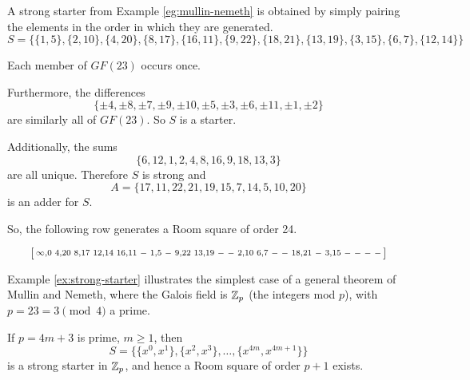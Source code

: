 \begin{example}[label=ex:strong-starter]
A strong starter from Example \ref{eg:mullin-nemeth} is obtained by simply pairing the elements in the order in which they are generated.
\begin{equation}
S = \{\{1, 5\}, \{2, 10\}, \{4, 20\}, \{8, 17\}, \{16, 11\}, \{9, 22\}, \{18, 21\}, \{13, 19\}, \{3, 15\}, \{6, 7\}, \{12, 14\}\}
\end{equation}

Each member of $GF(23)$ occurs once.

Furthermore, the differences
\begin{equation}
  \{\pm 4, \pm 8, \pm 7, \pm 9, \pm 10, \pm 5, \pm 3, \pm 6, \pm 11, \pm 1, \pm 2\}
\end{equation}
are similarly all of $GF(23)$.
So $S$ is a starter.

Additionally, the sums
\begin{equation}
  \{6, 12, 1, 2, 4, 8, 16, 9, 18, 13, 3\}
\end{equation}
are all unique.
Therefore $S$ is strong and
\begin{equation}
  A = \{17, 11, 22, 21, 19, 15, 7, 14, 5, 10, 20\}
\end{equation}
is an adder for $S$.

So, the following row generates a Room square of order 24.

\begin{equation*}
  \begin{bsmallmatrix}
    \infty, 0 & 4,20 & 8,17 & 12,14 & 16,11 & - & 1,5 & - & 9,22 & 13,19 & - & - & 2,10 & 6,7 & - & - & 18,21 & - & 3,15 & - & - & - & - \\
  \end{bsmallmatrix}
\end{equation*}

\end{example}

Example \ref{ex:strong-starter} illustrates the simplest case of a general theorem of Mullin and Nemeth, where the Galois field is $\mathbb{Z}_{p}$ (the integers mod $p$), with $p = 23 = 3\pmod 4$ a prime.

\begin{theorem}
\label{thm:strong-starter}
If $p = 4m + 3$ is prime, $m \geq 1$, then
\begin{equation}
S = \{\{x^0, x^1\}, \{x^2, x^3\}, \ldots, \{x^{4m}, x^{4m + 1}\}\}
\end{equation}
is a strong starter in $\mathbb{Z}_{p}$, and hence a Room square of order $p + 1$ exists.
\end{theorem}

